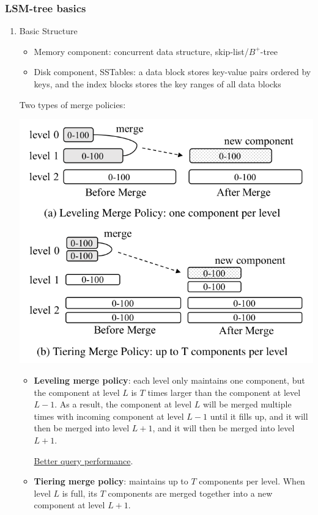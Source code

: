 \documentclass[11pt]{article}
\begin{document}
\subsubsection{LSM-tree basics}
\label{sec:org34a5b2f}
\begin{enumerate}
\item Basic Structure
\label{sec:org9b88568}
\begin{itemize}
\item Memory component: concurrent data structure, skip-list/\(B^+\)-tree
\item Disk component, SSTables: a data block stores key-value pairs ordered by keys, and the index blocks
stores the key ranges of all data blocks
\end{itemize}

Two types of merge policies:
\begin{center}
\includegraphics[width=.8\textwidth]{../images/db/4.png}
\end{center}
\begin{itemize}
\item \textbf{Leveling merge policy}: each level only maintains one component, but the component at level \(L\) is
\(T\) times larger than the component at level \(L-1\). As a result, the component at level \(L\)
will be merged multiple times with incoming component at level \(L-1\) until it fills up, and it
will then be merged into level \(L+1\), and it will then be merged into level \(L+1\).

\uline{Better query performance}.
\item \textbf{Tiering merge policy}: maintains up to \(T\) components per level. When level \(L\) is full, its
\(T\) components are merged together into a new component at level \(L+1\).


\end{itemize}
\end{enumerate}
\end{document}
